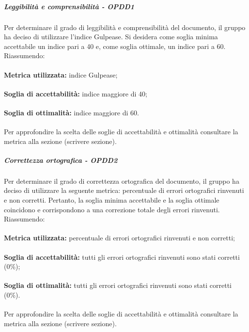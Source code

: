 \documentclass[PianoDiQualifica.tex]{subfiles}
\begin{document}
				\subparagraph{Leggibilità e comprensibilità - OPDD1}
				Per determinare il grado di leggibilità e comprensibilità del documento, il gruppo ha deciso di utilizzare l'indice Gulpease. Si desidera come soglia minima accettabile un indice
				pari a 40 e, come soglia ottimale, un indice pari a 60. \\
				Riassumendo: \\ \\
				\textbf{Metrica utilizzata:} indice Gulpease; \\ \\
				\textbf{Soglia di accettabilità:} indice maggiore di 40; \\ \\
				\textbf{Soglia di ottimalità:} indice maggiore di 60. \\ \\
				Per approfondire la scelta delle soglie di accettabilità e ottimalità consultare la metrica alla sezione (scrivere sezione).
				
				\subparagraph{Correttezza ortografica - OPDD2}
				Per determinare il grado di correttezza ortografica del documento, il gruppo ha deciso di utilizzare la seguente metrica: percentuale di errori ortografici rinvenuti e non corretti.
				Pertanto, la soglia minima accettabile e la soglia ottimale coincidono e corrispondono a una correzione totale degli errori rinvenuti. \\
				Riassumendo: \\ \\
				\textbf{Metrica utilizzata:} percentuale di errori ortografici rinvenuti e non corretti; \\ \\
				\textbf{Soglia di accettabilità:} tutti gli errori ortografici rinvenuti sono stati corretti (0\%); \\ \\
				\textbf{Soglia di ottimalità:} tutti gli errori ortografici rinvenuti sono stati corretti (0\%). \\ \\
				Per approfondire la scelta delle soglie di accettabilità e ottimalità consultare la metrica alla sezione (scrivere sezione).
				
\end{document}
